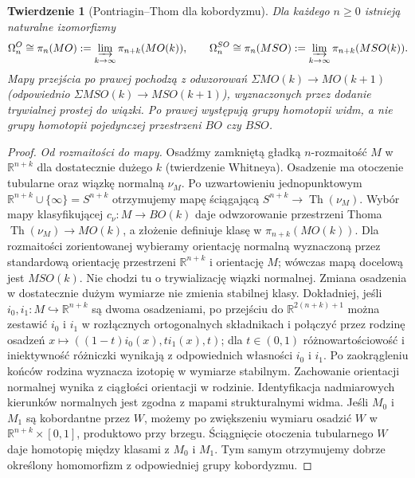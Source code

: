 \documentclass[11pt,a4paper,oneside]{report}
\newcommand{\R}{\mathbb{R}}
\theoremstyle{plain}
\newtheorem{twierdzenie}{Twierdzenie}[section]
\theoremstyle{definition}
\theoremstyle{remark}
\begin{document}
\begin{twierdzenie}[Pontriagin--Thom dla kobordyzmu]
\label{thm:pt-MO-v9}
Dla każdego $n\ge0$ istnieją naturalne izomorfizmy
\[
\Omega_n^O\cong\pi_n(MO):=
\varinjlim_{k\to\infty}\pi_{n+k}(MO(k)),
\qquad
\Omega_n^{SO}\cong\pi_n(MSO):=
\varinjlim_{k\to\infty}\pi_{n+k}(MSO(k)).
\]
Mapy przejścia po prawej pochodzą z odwzorowań
$\Sigma MO(k)\to MO(k+1)$ (odpowiednio
$\Sigma MSO(k)\to MSO(k+1)$), wyznaczonych
przez dodanie trywialnej prostej do wiązki.
Po prawej występują grupy homotopii \emph{widm},
a nie grupy homotopii pojedynczej przestrzeni $BO$
czy $BSO$.
\end{twierdzenie}
\begin{proof}
\emph{Od rozmaitości do mapy.}
Osadźmy zamkniętą gładką $n$-rozmaitość
$M$ w $\R^{n+k}$ dla dostatecznie dużego $k$
(twierdzenie Whitneya). Osadzenie ma otoczenie
tubularne oraz wiązkę normalną $\nu_M$.
Po uzwartowieniu jednopunktowym
$\R^{n+k}\cup\{\infty\}=S^{n+k}$ otrzymujemy mapę ściągającą
$S^{n+k}\to\operatorname{Th}(\nu_M)$.
Wybór mapy klasyfikującej
$c_\nu:M\to BO(k)$ daje odwzorowanie przestrzeni
Thoma $\operatorname{Th}(\nu_M)\to MO(k)$,
a złożenie definiuje klasę w $\pi_{n+k}(MO(k))$.
Dla rozmaitości zorientowanej wybieramy orientację normalną
wyznaczoną przez standardową orientację przestrzeni
$\R^{n+k}$ i orientację $M$; wówczas mapą docelową jest
$MSO(k)$. Nie chodzi tu o trywializację wiązki normalnej.
Zmiana osadzenia w dostatecznie dużym wymiarze nie
zmienia stabilnej klasy. Dokładniej, jeśli
$i_0,i_1:M\hookrightarrow\R^{n+k}$ są dwoma osadzeniami,
po przejściu do $\R^{2(n+k)+1}$ można zestawić
$i_0$ i $i_1$ w rozłącznych ortogonalnych składnikach
i połączyć przez rodzinę osadzeń
$x\mapsto((1-t)i_0(x),t i_1(x),t)$; dla $t\in(0,1)$
różnowartościowość i iniektywność różniczki wynikają
z odpowiednich własności $i_0$ i $i_1$.
Po zaokrągleniu końców rodzina wyznacza izotopię
w wymiarze stabilnym. Zachowanie orientacji
normalnej wynika z ciągłości orientacji w rodzinie.
Identyfikacja nadmiarowych kierunków normalnych
jest zgodna z mapami strukturalnymi widma.
Jeśli $M_0$ i $M_1$ są kobordantne przez $W$,
możemy po zwiększeniu wymiaru osadzić $W$ w
$\R^{n+k}\times[0,1]$, produktowo przy brzegu.
Ściągnięcie otoczenia tubularnego $W$ daje homotopię
między klasami z $M_0$ i $M_1$. Tym samym
otrzymujemy dobrze określony homomorfizm z
odpowiedniej grupy kobordyzmu.


\end{proof}
\end{document}

